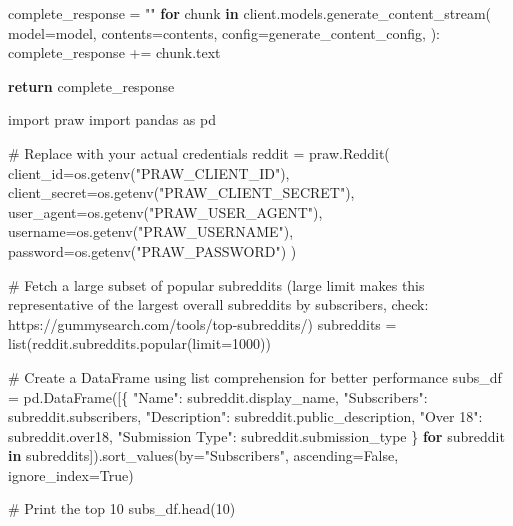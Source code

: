 \documentclass[
  12pt,
  letterpaper,
  DIV=11,
  numbers=noendperiod]{scrartcl}
\newenvironment{Shaded}{\begin{snugshade}}{\end{snugshade}}
\newcommand{\BuiltInTok}[1]{\textcolor[rgb]{0.00,0.23,0.31}{#1}}
\newcommand{\CommentTok}[1]{\textcolor[rgb]{0.37,0.37,0.37}{#1}}
\newcommand{\ControlFlowTok}[1]{\textcolor[rgb]{0.00,0.23,0.31}{\textbf{#1}}}
\newcommand{\DecValTok}[1]{\textcolor[rgb]{0.68,0.00,0.00}{#1}}
\newcommand{\ImportTok}[1]{\textcolor[rgb]{0.00,0.46,0.62}{#1}}
\newcommand{\KeywordTok}[1]{\textcolor[rgb]{0.00,0.23,0.31}{\textbf{#1}}}
\newcommand{\NormalTok}[1]{\textcolor[rgb]{0.00,0.23,0.31}{#1}}
\newcommand{\OperatorTok}[1]{\textcolor[rgb]{0.37,0.37,0.37}{#1}}
\newcommand{\StringTok}[1]{\textcolor[rgb]{0.13,0.47,0.30}{#1}}
\newcommand{\VariableTok}[1]{\textcolor[rgb]{0.07,0.07,0.07}{#1}}
\begin{document}
\begin{Shaded}
\begin{Highlighting}[]
\NormalTok{    complete\_response }\OperatorTok{=} \StringTok{""}
    \ControlFlowTok{for}\NormalTok{ chunk }\KeywordTok{in}\NormalTok{ client.models.generate\_content\_stream(}
\NormalTok{        model}\OperatorTok{=}\NormalTok{model,}
\NormalTok{        contents}\OperatorTok{=}\NormalTok{contents,}
\NormalTok{        config}\OperatorTok{=}\NormalTok{generate\_content\_config,}
\NormalTok{    ):}
\NormalTok{        complete\_response }\OperatorTok{+=}\NormalTok{ chunk.text}

    \ControlFlowTok{return}\NormalTok{ complete\_response}
\end{Highlighting}
\end{Shaded}

\begin{Shaded}
\begin{Highlighting}[]
\ImportTok{import}\NormalTok{ praw}
\ImportTok{import}\NormalTok{ pandas }\ImportTok{as}\NormalTok{ pd}

\CommentTok{\# Replace with your actual credentials}
\NormalTok{reddit }\OperatorTok{=}\NormalTok{ praw.Reddit(}
\NormalTok{    client\_id}\OperatorTok{=}\NormalTok{os.getenv(}\StringTok{"PRAW\_CLIENT\_ID"}\NormalTok{),}
\NormalTok{    client\_secret}\OperatorTok{=}\NormalTok{os.getenv(}\StringTok{"PRAW\_CLIENT\_SECRET"}\NormalTok{),}
\NormalTok{    user\_agent}\OperatorTok{=}\NormalTok{os.getenv(}\StringTok{"PRAW\_USER\_AGENT"}\NormalTok{),}
\NormalTok{    username}\OperatorTok{=}\NormalTok{os.getenv(}\StringTok{"PRAW\_USERNAME"}\NormalTok{),}
\NormalTok{    password}\OperatorTok{=}\NormalTok{os.getenv(}\StringTok{"PRAW\_PASSWORD"}\NormalTok{)}
\NormalTok{)}

\CommentTok{\# Fetch a large subset of popular subreddits (large limit makes this representative of the largest overall subreddits by subscribers, check: https://gummysearch.com/tools/top{-}subreddits/)}
\NormalTok{subreddits }\OperatorTok{=} \BuiltInTok{list}\NormalTok{(reddit.subreddits.popular(limit}\OperatorTok{=}\DecValTok{1000}\NormalTok{))}

\CommentTok{\# Create a DataFrame using list comprehension for better performance}
\NormalTok{subs\_df }\OperatorTok{=}\NormalTok{ pd.DataFrame([\{}
    \StringTok{"Name"}\NormalTok{: subreddit.display\_name,}
    \StringTok{"Subscribers"}\NormalTok{: subreddit.subscribers,}
    \StringTok{"Description"}\NormalTok{: subreddit.public\_description,}
    \StringTok{"Over 18"}\NormalTok{: subreddit.over18,}
    \StringTok{"Submission Type"}\NormalTok{: subreddit.submission\_type}
\NormalTok{\} }\ControlFlowTok{for}\NormalTok{ subreddit }\KeywordTok{in}\NormalTok{ subreddits]).sort\_values(by}\OperatorTok{=}\StringTok{"Subscribers"}\NormalTok{, ascending}\OperatorTok{=}\VariableTok{False}\NormalTok{, ignore\_index}\OperatorTok{=}\VariableTok{True}\NormalTok{)}

\CommentTok{\# Print the top 10}
\NormalTok{subs\_df.head(}\DecValTok{10}\NormalTok{)}
\end{Highlighting}
\end{Shaded}
\end{document}
